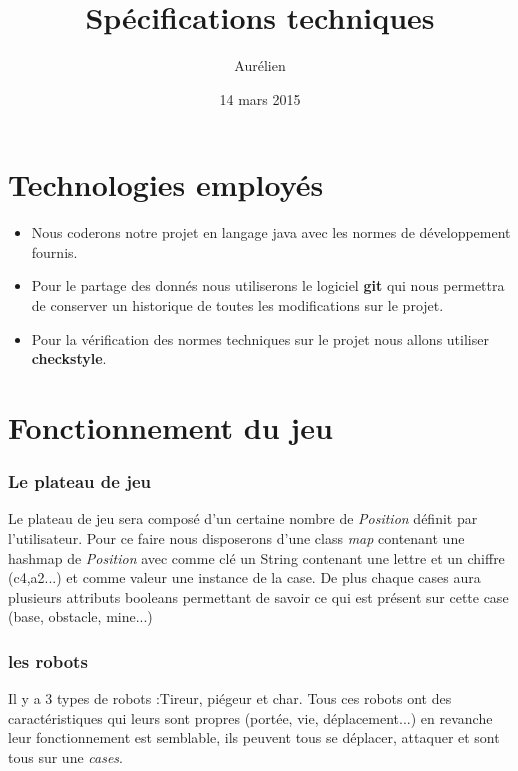 \documentclass[12pt]{article}
\title{Spécifications techniques}
\author{Aurélien \bsc{Svevi}}
\date{14 mars 2015}
\begin{document}
\maketitle

\tableofcontents

\newpage
{}
\part*{Technologies employés}
\begin{itemize}
\item Nous coderons notre projet en langage java avec les normes de développement fournis.
\\
\item Pour le partage des donnés nous utiliserons le logiciel \textbf{git} qui nous permettra de conserver un historique de toutes les modifications sur le projet.

\item Pour la vérification des normes techniques sur le projet nous allons utiliser \textbf{checkstyle}. 

\end{itemize}

\newpage
{}
\part*{Fonctionnement du jeu}
\section{Le plateau de jeu}
Le plateau de jeu sera composé d'un certaine nombre de \emph{Position} définit par l'utilisateur.
Pour ce faire nous disposerons d'une class \emph{map} contenant une hashmap de \emph{Position} avec comme clé un String contenant une lettre et un chiffre (c4,a2...) et comme valeur une instance de la case.
De plus chaque cases aura plusieurs attributs booleans permettant de savoir ce qui est présent sur cette case (base, obstacle, mine...)

\section{les robots}
Il y a 3 types de robots :Tireur, piégeur et char.
Tous ces robots ont des caractéristiques qui leurs sont propres (portée, vie, déplacement...) en revanche leur fonctionnement est semblable, ils peuvent tous se déplacer, attaquer et sont tous sur une \emph{cases}.
\end{document}
